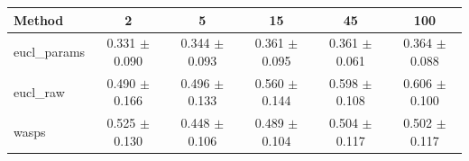 \begin{table}[htbp]
\centering
\begin{NiceTabular}{lccccc}
\toprule
Method & 2 & 5 & 15 & 45 & 100 \\
\midrule
eucl\_params & 0.331 $\pm$ 0.090 & 0.344 $\pm$ 0.093 & 0.361 $\pm$ 0.095 & 0.361 $\pm$ 0.061 & 0.364 $\pm$ 0.088 \\
eucl\_raw & 0.490 $\pm$ 0.166 & 0.496 $\pm$ 0.133 & 0.560 $\pm$ 0.144 & 0.598 $\pm$ 0.108 & 0.606 $\pm$ 0.100 \\
wasps & 0.525 $\pm$ 0.130 & 0.448 $\pm$ 0.106 & 0.489 $\pm$ 0.104 & 0.504 $\pm$ 0.117 & 0.502 $\pm$ 0.117 \\
\bottomrule
\end{NiceTabular}
\label{tab:sens_cpazmal_n_train_barycenter}
\end{table}
